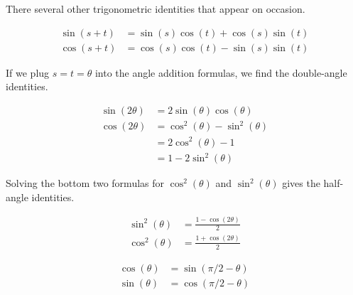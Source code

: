 \documentclass{ximera}
\begin{document}
There several other trigonometric identities that appear on occasion.
\begin{theorem}
	\begin{align*}
		\sin(s + t) &= \sin(s)\cos(t)  + \cos(s)\sin(t) \\
		\cos(s+t) &= \cos(s)\cos(t) - \sin(s)\sin(t)
	\end{align*}
\end{theorem}

If we plug $s = t = \theta$ into the angle addition formulas, we find the double-angle identities.
\begin{theorem}
	\begin{align*}
		\sin(2 \theta) &= 2\sin(\theta)\cos(\theta)\\
		\cos(2\theta) &= \cos^2(\theta) - \sin^2(\theta)\\
			&= 2 \cos^2(\theta)-1\\
			&= 1 - 2 \sin^2(\theta)
	\end{align*}
\end{theorem}

Solving the bottom two formulas for $\cos^2(\theta)$ and $\sin^2(\theta)$ gives the half-angle identities.
\begin{theorem}
	\begin{align*}
		\sin^2(\theta) &= \frac{1-\cos(2\theta)}{2}\\
		\cos^2(\theta) &= \frac{1+\cos(2\theta)}{2}	
	\end{align*}
\end{theorem}

\begin{theorem}
	\begin{align*}
		\cos(\theta) &= \sin(\pi/2-\theta)\\
		\sin(\theta) &= \cos(\pi/2-\theta)
	\end{align*}
\end{theorem}
\end{document}
